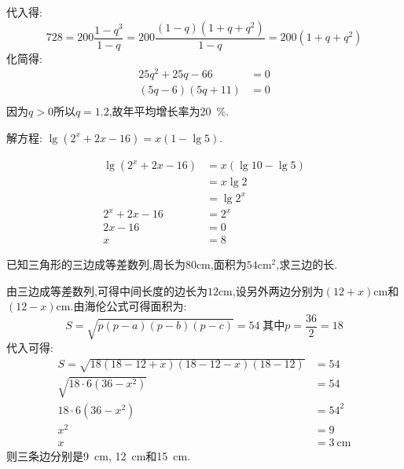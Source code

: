 \begin{questions}
\begin{solution}
		代入得:
		\begin{equation*}
			728 = 200 \frac{1-q^3}{1-q} = 200 \frac{(1-q)(1 + q + q^2)}{1-q} = 200(1 + q + q^2)
		\end{equation*}
		化简得:
		\begin{align*}
			25q^2 + 25q - 66  & = 0 \\
			(5q - 6)(5q + 11) & = 0 \\
		\end{align*}
		因为$q > 0$所以$q=1.2$,故年平均增长率为\qty{20}{\percent}.
	\end{solution}

	\question[8] 解方程:
	\begin{math}
		\lg(2^x + 2x - 16) = x(1-\lg5)
	\end{math}.
	\begin{solution}
		\begin{align*}
			\lg(2^x + 2x - 16) & = x(\lg10 - \lg5) \\
			                   & = x\lg2           \\
			                   & = \lg2^x          \\
			2^x + 2x - 16      & = 2^x             \\
			2x - 16            & = 0               \\
			x                  & = 8
		\end{align*}
	\end{solution}

	\question[8] 已知三角形的三边成等差数列,周长为$80$cm,面积为$54$cm$^2$,求三边的长.
	\begin{solution}
		由三边成等差数列,可得中间长度的边长为$12$cm,设另外两边分别为$(12+x)$cm和$(12-x)$cm.由海伦公式可得面积为:
		\begin{equation*}
			S = \sqrt{p(p-a)(p-b)(p-c)} = 54\; \text{其中} p = \frac{36}{2} = 18
		\end{equation*}
		代入可得:
		\begin{align*}
			S = \sqrt{18(18 - 12 + x)(18 - 12 - x)(18 - 12)} & = 54           \\
			\sqrt{18\cdot 6 (36-x^2)}                        & = 54           \\
			18\cdot 6 (36- x^2)                              & = 54^2         \\
			x^2                                              & = 9            \\
			x                                                & = \qty{3}{\cm}
		\end{align*}
		则三条边分别是\qty{9}{\cm}, \qty{12}{\cm}和\qty{15}{\cm}.
	\end{solution}


\end{questions}
